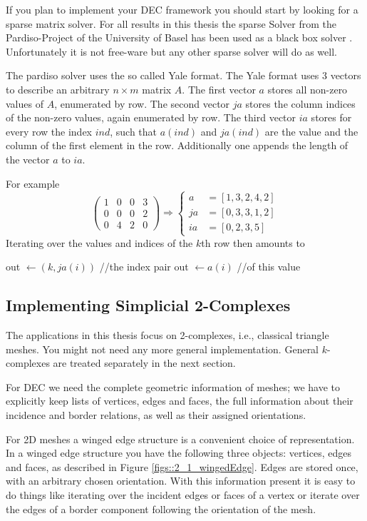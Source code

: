 If you plan to implement your DEC framework you should start by looking for a sparse matrix solver. For all results in this thesis the sparse Solver from the Pardiso-Project of the University of Basel has been used as a black box solver \cite{pardiso1}. Unfortunately it is not free-ware but any other sparse solver will do as well.

The pardiso solver uses the so called Yale format. The Yale format uses 3 vectors to describe an arbitrary $n\times m$ matrix $A$. The first vector $a$ stores all non-zero values of $A$, enumerated by row. The second vector $ja$ stores the column indices of the non-zero values, again enumerated by row. The third vector $ia$ stores for every row the index $ind$, such that $a(ind)$ and $ja(ind)$ are the value and the column of the first element in the row. Additionally one appends the length of the vector $a$ to $ia$.

For example 
\[\begin{pmatrix}
1 & 0 & 0 &3 \\
 0 & 0 & 0 &2 \\
 0 & 4&2&0
\end{pmatrix} \Rightarrow \begin{cases} a &= [1,3,2,4,2]\\ ja &= [0,3,3,1,2] \\ ia &= [0,2,3,5]  \end{cases}\]
Iterating over the values and indices of the $k$th row then amounts to
\begin{algorithmic}
	\STATE out $\gets (k,ja(i))$   //the index pair
	\STATE out $\gets a(i)$  //of this value
\ENDFOR
\end{algorithmic}

\subsection{Implementing Simplicial 2-Complexes}
\label{sec::2_handsOnSimplicialComplexes}
The applications in this thesis focus on 2-complexes, i.e., classical triangle meshes. You might not need any more general implementation. General $k$-complexes are treated separately in the next section. 

For DEC we need the complete geometric information of meshes; we have to explicitly keep lists of vertices, edges and faces, the full information about their incidence and border relations, as well as their assigned orientations. 

For 2D meshes a winged edge structure is a convenient choice of representation. In a winged edge structure you have the following three objects: vertices, edges and faces, as described in Figure \ref{figs::2_1_wingedEdge}. Edges are stored once, with an arbitrary chosen orientation. With this information present it is easy to do things like iterating over the incident edges or faces of a vertex or iterate over the edges of a border component following the orientation of the mesh.

